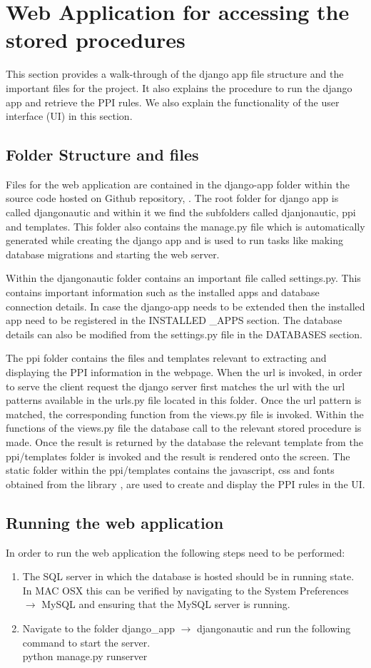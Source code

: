 \documentclass[msc,deptreport,ai]{infthesis}      %
\begin{document}
\section{Web Application for accessing the stored procedures}
This section provides a walk-through of the django app file structure and the important files for the project. It also explains the procedure to run the django app and retrieve the PPI rules. We also explain the functionality of the user interface (UI) in this section.
\subsection {Folder Structure and files}
Files for the web application are contained in the django-app folder within the source code hosted on Github repository, \cite{sourceCode}. The root folder for django app is called djangonautic and within it we find the  subfolders called djanjonautic, ppi and templates. This folder also contains the manage.py file which is automatically generated while creating the django app and is used to run tasks like making database migrations and starting the web server. 

Within the djangonautic folder contains an important file called settings.py. This contains important information such as the installed apps and database connection details. In case the django-app needs to be extended then the installed app need to be registered in the INSTALLED \_APPS section. The database details can also be modified from the settings.py file in the DATABASES section.

The ppi folder contains the files and templates relevant to extracting and displaying the PPI information in the webpage. When the url is invoked, in order to serve the client request the django server first matches the url with the url patterns available in the urls.py file located in this folder. Once the url pattern is matched, the corresponding function from the views.py file is invoked. Within the functions of the views.py file the database call to the relevant stored procedure is made. Once the result is returned by the database the relevant template from the ppi/templates folder is invoked and the result is rendered onto the screen. The static folder within the ppi/templates contains the javascript, css and fonts obtained from the library \cite{dataTables}, are used to create and display the PPI rules in the UI. 
\subsection {Running the web application}
In order to run the web application the following steps need to be performed:
 \begin{enumerate}
 	\item  The SQL server in which the database is hosted should be in running state. In MAC OSX this can be verified by navigating to the System Preferences $\to$ MySQL and ensuring that the MySQL server is running. 
 	\item Navigate to the folder django\_app $\to$ djangonautic and run the following command to start the server.\\
 	python manage.py runserver
 \end{enumerate}
\end{document}
